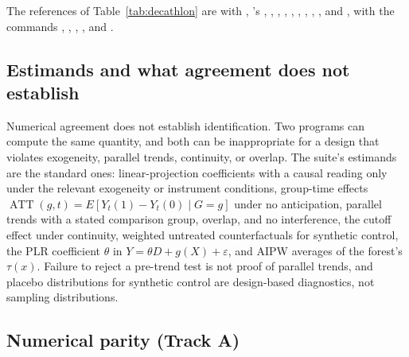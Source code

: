 The references of Table~\ref{tab:decathlon} are  with
 \citep{zeileis2020sandwich}, 's 
\citep{kleiber2008applied}, 
\citep{berge2018efficient,berge2026fixest}, 
\citep{callaway2021difference}, 
\citep{calonico2014robust,calonico2015rdrobust}, 
\citep{cattaneo2018manipulation,cattaneo2020simple}, 
\citep{abadie2011synth},  \citep{arkhangelsky2021synthetic},
 \citep{bach2022doubleml,bach2024doubleml}, 
\citep{athey2019generalized}, and  \citep{ho2011matchit}, with
the  commands  \citep{rios2022csdid},
 \citep{clarke2024synthetic}, 
\citep{sun2021estimating},  \citep{correia2017linear}, and
 \citep{ahrens2024ddml}.

\subsection{Estimands and what agreement does not establish}
\label{sec:statistical-contracts}

Numerical agreement does not establish identification. Two programs can
compute the same quantity, and both can be inappropriate for a design
that violates exogeneity, parallel trends, continuity, or overlap. The
suite's estimands are the standard ones: linear-projection coefficients
with a causal reading only under the relevant exogeneity or instrument
conditions, group-time effects
\(\operatorname{ATT}(g,t) = E[Y_t(1)-Y_t(0)\mid G=g]\) under no
anticipation, parallel trends with a stated comparison group, overlap, and
no interference, the cutoff effect under continuity, weighted untreated
counterfactuals for synthetic control, the PLR coefficient \(\theta\) in
\(Y=\theta D+g(X)+\varepsilon\), and AIPW averages of the forest's
\(\tau(x)\). Failure to reject a pre-trend test is not proof of parallel
trends, and placebo distributions for synthetic control are design-based
diagnostics, not sampling distributions.

\subsection{Numerical parity (Track A)}\label{sec:track-a}

